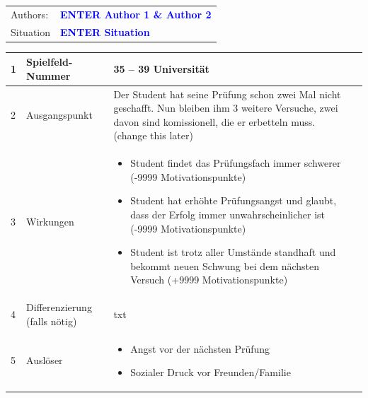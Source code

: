 \documentclass[12pt, a4paper]{article}
\newcommand{\authortext}{ENTER Author 1 \& Author 2}
\newcommand{\situation}{ENTER Situation}
\begin{document}
\begin{tabular}{l l} 
Authors: & \textbf{\textcolor{blue}{\large\authortext}}\\ 
Situation & \textbf{\textcolor{blue}{\large\situation}}
\end{tabular}

\vspace{1em}

\centerline{
	}

\vspace{1em}

\begin{table}[h!]
	\begin{tabularx}{\textwidth}{|p{0.3cm}|p{3.5cm}|X|p{0.3cm}|}
		\hline
		1 & Spielfeld-Nummer                       & 35 – 39 Universität &  \\
		\hline
		2 & Ausgangspunkt                          & 
		Der Student hat seine Prüfung schon zwei Mal nicht geschafft.
		Nun bleiben ihm 3 weitere Versuche, zwei davon sind komissionell, die er erbetteln muss. (change this later) &  \\
		\hline
		3 & Wirkungen                              &
		\begin{itemize}[noitemsep, topsep=0pt]
			\item Student findet das Prüfungsfach immer schwerer (-9999 Motivationspunkte)
			\item Student hat erhöhte Prüfungsangst und glaubt, dass der Erfolg immer unwahrscheinlicher ist (-9999 Motivationspunkte)
			\item Student ist trotz aller Umstände standhaft und bekommt neuen Schwung bei dem nächsten Versuch (+9999 Motivationspunkte)
		\end{itemize} &  \\
		\hline
		4 & Differenzierung \newline (falls nötig) & txt &  \\
		\hline
		5 & Auslöser                               & 
		\begin{itemize}[noitemsep, topsep=0pt]
			\item Angst vor der nächsten Prüfung
			\item Sozialer Druck vor Freunden/Familie
		\end{itemize}
  &  \\
		\hline
	\end{tabularx}
\end{table}
\end{document}
